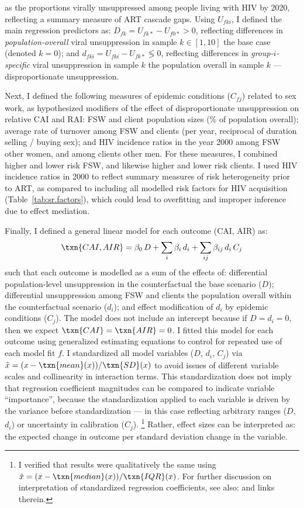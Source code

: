 as the proportions virally unsuppressed among people living with HIV by 2020,
reflecting a summary measure of ART cascade gaps.
Using $U_{fki}$, I defined the main regression predictors as:
$D_{fk} = U_{fk*} - U_{f0*} > 0$, reflecting differences in
\emph{population-overall} viral unsuppression in sample $k \in [1,10]$
\vs the base case (denoted $k = 0$); and
$d_{fki} = U_{fki} - U_{fk*} \lessgtr 0$, reflecting differences in
\emph{group-$i$-specific} viral unsuppression in sample $k$
\vs the population overall in sample $k$ --- \ie disproportionate unsuppression.
\par
Next, I defined the following measures of epidemic conditions ($C_{fj}$) related to sex work,
as hypothesized modifiers of the effect of disproportionate unsuppression on relative CAI and RAI:
FSW and client population sizes (\% of population overall);
average rate of turnover among FSW and clients
(per year, reciprocal of duration selling / buying sex); and
HIV incidence ratios in the year 2000 among FSW \vs other women, and among clients \vs other men.
For these measures, I combined higher and lower risk FSW,
and likewise higher and lower risk clients.
I used HIV incidence ratios in 2000 to reflect
summary measures of risk heterogeneity prior to ART,
as compared to including all modelled risk factors
for HIV acquisition (\eg Table~\ref{tab:sr.factors}),
which could lead to overfitting and improper inference due to effect mediation. %
\par
Finally, I defined a general linear model for each outcome (CAI, AIR) as:
\begin{equation}\label{eq:art.glm}
  \txn{CAI, AIR} = \beta_0\,D
                 + \sum_i \beta_i\,d_i
                 + \sum_{ij} \beta_{ij}\,d_i\,C_j
\end{equation}
such that each outcome is modelled as a sum of the effects of:
differential population-level unsuppression in the counterfactual
\vs the base scenario ($D$);
differential unsuppression among FSW and clients
\vs the population overall within the counterfactual scenario ($d_i$); and
effect modification of $d_i$ by epidemic conditions ($C_j$).
The model does not include an intercept because if $D = d_i = 0$,
then we expect $\txn{CAI} = \txn{AIR} = 0$.
I fitted this model for each outcome using generalized estimating equations \cite{Halekoh2006}
to control for repeated use of each model fit $f$.
I standardized all model variables ($D$, $d_i$, $C_j$) via
$\hat{x} = (x - \txn{mean}(x)) / \txn{SD}(x)$
to avoid issues of different variable scales and collinearity in interaction terms.
This standardization does not imply that
regression coefficient magnitudes can be compared to indicate variable ``importance'',
because the standardization applied to each variable is driven
by the variance before standardization
--- in this case reflecting arbitrary ranges ($D$, $d_i$) or uncertainty in calibration ($C_j$).%
\footnote{I verified that results were qualitatively the same using
  $\hat{x} = (x - \txn{median}(x)) / \txn{IQR}(x)$.
  For further discussion on interpretation of standardized regression coefficients,
  see also:  and links therein.}
Rather, effect sizes can be interpreted as:
the expected change in outcome per standard deviation change in the variable.
